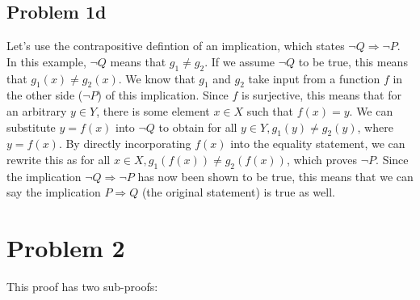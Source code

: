 \documentclass{article}
\begin{document}
\subsection{Problem 1d}

Let's use the contrapositive defintion of an implication, which states $\neg Q \Rightarrow \neg P$. In this example, $\neg Q$ means that $g_1 \neq g_2$. If we assume $\neg Q$ to be true, this means that $g_1(x) \neq g_2(x)$. We know that $g_1$ and $g_2$ take input from a function $f$ in the other side ($\neg P$) of this implication. Since $f$ is surjective, this means that for an arbitrary $y \in Y$, there is some element $x \in X$ such that $f(x) = y$. We can substitute $y = f(x)$ into $\neg Q$ to obtain for all $y \in Y, g_1(y) \neq g_2(y)$, where $y = f(x)$. By directly incorporating $f(x)$ into the equality statement, we can rewrite this as for all $x \in X, g_1(f(x)) \neq g_2(f(x))$, which proves $\neg P$. Since the implication $\neg Q \Rightarrow \neg P$ has now been shown to be true, this means that we can say the implication $P \Rightarrow Q$ (the original statement) is true as well.

\section{Problem 2}

This proof has two sub-proofs:
\end{document}
